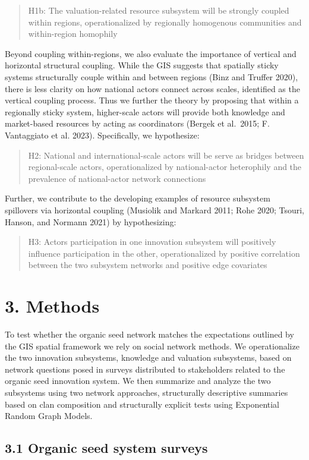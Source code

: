 \documentclass[twoside,12pt,final]{ucthesis-CA2012}
\begin{document}
\begin{ucmainmatter}
\begin{quote}
H1b: The valuation-related resource subsystem will be strongly coupled
within regions, operationalized by regionally homogenous communities
and within-region homophily
\end{quote}
Beyond coupling within-regions, we also evaluate the importance of
vertical and horizontal structural coupling. While the GIS suggests that
spatially sticky systems structurally couple within and between regions
(Binz and Truffer 2020),
there is less clarity on how national actors connect across scales,
identified as the vertical coupling process. Thus we further the theory
by proposing that within a regionally sticky system, higher-scale actors
will provide both knowledge and market-based resources by acting as
coordinators (Bergek et al.~2015; F. Vantaggiato et al.
2023). Specifically, we
hypothesize:
\begin{quote}
H2: National and international-scale actors will be serve as bridges
between regional-scale actors, operationalized by national-actor
heterophily and the prevalence of national-actor network connections
\end{quote}
Further, we contribute to the developing examples of resource subsystem
spillovers via horizontal coupling (Musiolik and Markard 2011; Rohe
2020; Tsouri, Hanson, and Normann
2021) by hypothesizing:
\begin{quote}
H3: Actors\textquotesingle{} participation in one innovation subsystem will positively
influence participation in the other, operationalized by positive
correlation between the two subsystem networks and positive edge
covariates
\end{quote}
\hypertarget{methods-1}{%
\section{3. Methods}\label{methods-1}}

To test whether the organic seed network matches the expectations
outlined by the GIS spatial framework we rely on social network methods.
We operationalize the two innovation subsystems, knowledge and valuation
subsystems, based on network questions posed in surveys distributed to
stakeholders related to the organic seed innovation system. We then
summarize and analyze the two subsystems using two network approaches,
structurally descriptive summaries based on clan composition and
structurally explicit tests using Exponential Random Graph Models.

\hypertarget{organic-seed-system-surveys}{%
\subsection{3.1 Organic seed system surveys}\label{organic-seed-system-surveys}}


\end{ucmainmatter}
\end{document}
